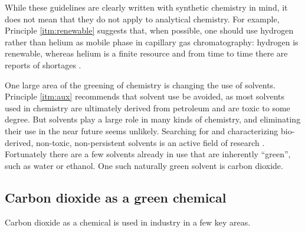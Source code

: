While these guidelines are clearly written with synthetic chemistry in mind, it
does not mean that they do not apply to analytical chemistry. For example,
Principle \ref{itm:renewable} suggests that, when possible, one should use
hydrogen rather than helium as mobile phase in capillary gas chromatography:
hydrogen is renewable, whereas helium is a finite resource and from time to time
there are reports of shortages \autocite{Kornblut2019}.

One large area of the greening of chemistry is changing the use of solvents.
Principle \ref{itm:aux} recommends that solvent use be avoided, as most solvents
used in chemistry are ultimately derived from petroleum and are toxic to some
degree. But solvents play a large role in many kinds of chemistry, and
eliminating their use in the near future seems unlikely. Searching for and
characterizing bio-derived, non-toxic, non-persistent solvents is an active
field of research \autocite{Clarke2018}. Fortunately there are a few solvents
already in use that are inherently ``green'', such as water or ethanol. One such
naturally green solvent is carbon dioxide.
 

\subsection{Carbon dioxide as a green chemical}

Carbon dioxide as a chemical is used in industry in a few key areas.

